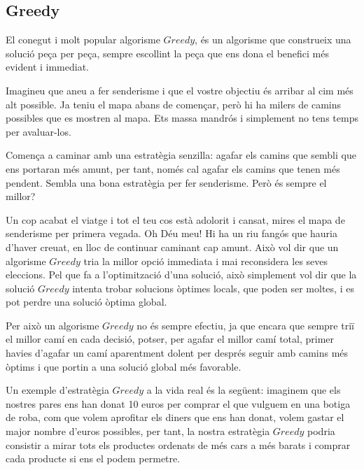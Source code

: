\subsection{Greedy}

El conegut i molt popular algorisme $Greedy$, és un algorisme que construeix una solució peça per peça, sempre escollint la peça que ens dona el benefici més evident i immediat. \newline
 
Imagineu que aneu a fer senderisme i que el vostre objectiu és arribar al cim més alt possible. Ja teniu el mapa abans de començar, però hi ha milers de camins possibles que es mostren al mapa. Ets massa mandrós i simplement no tens temps per avaluar-los. \newline

Comença a caminar amb una estratègia senzilla: agafar els camins que sembli que ens portaran més amunt, per tant, només cal agafar els camins que tenen més pendent. Sembla una bona estratègia per fer senderisme. Però és sempre el millor? \newline

Un cop acabat el viatge i tot el teu cos està adolorit i cansat, mires el mapa de senderisme per primera vegada. Oh Déu meu! Hi ha un riu fangós que hauria d'haver creuat, en lloc de continuar caminant cap amunt. Això vol dir que un algorisme $Greedy$ tria la millor opció immediata i mai reconsidera les seves eleccions. Pel que fa a l'optimització d'una solució, això simplement vol dir que la solució $Greedy$ intenta trobar solucions òptimes locals, que poden ser moltes, i es pot perdre una solució òptima global.\newline

Per això un algorisme $Greedy$ no és sempre efectiu, ja que encara que sempre triï el millor camí en cada decisió, potser, per agafar el millor camí total, primer havies d'agafar un camí aparentment dolent per després seguir amb camins més òptims i que portin a una solució global més favorable. \newline

Un exemple d'estratègia $Greedy$ a la vida real és la següent: imaginem que els nostres pares ens han donat 10 euros per comprar el que vulguem en una botiga de roba, com que volem aprofitar els diners que ens han donat, volem gastar el major nombre d'euros possibles, per tant, la nostra estratègia $Greedy$ podria consistir a mirar tots els productes ordenats de més cars a més barats i comprar cada producte si ens el podem permetre. \newline

